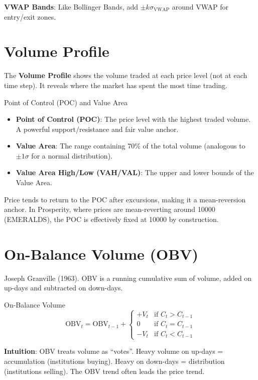 \documentclass[12pt,a4paper,openany]{report}
\theoremstyle{definition}
\begin{document}
\textbf{VWAP Bands}: Like Bollinger Bands, add $\pm k\sigma_{\text{VWAP}}$ around VWAP for entry/exit zones.

\section{Volume Profile}

The \textbf{Volume Profile} shows the volume traded at each price level (not at each time step). It reveals where the market has spent the most time trading.

\begin{definitionbox}{Point of Control (POC) and Value Area}
\begin{itemize}
  \item \textbf{Point of Control (POC)}: The price level with the highest traded volume. A powerful support/resistance and fair value anchor.
  \item \textbf{Value Area}: The range containing $70\%$ of the total volume (analogous to $\pm 1\sigma$ for a normal distribution).
  \item \textbf{Value Area High/Low (VAH/VAL)}: The upper and lower bounds of the Value Area.
\end{itemize}
\end{definitionbox}

Price tends to return to the POC after excursions, making it a mean-reversion anchor. In Prosperity, where prices are mean-reverting around 10000 (EMERALDS), the POC is effectively fixed at 10000 by construction.

\section{On-Balance Volume (OBV)}

Joseph Granville (1963). OBV is a running cumulative sum of volume, added on up-days and subtracted on down-days.

\begin{definitionbox}{On-Balance Volume}
\[
  \text{OBV}_t = \text{OBV}_{t-1} + \begin{cases} +V_t & \text{if } C_t > C_{t-1} \\ 0 & \text{if } C_t = C_{t-1} \\ -V_t & \text{if } C_t < C_{t-1} \end{cases}
\]
\end{definitionbox}

\textbf{Intuition}: OBV treats volume as ``votes''. Heavy volume on up-days = accumulation (institutions buying). Heavy on down-days = distribution (institutions selling). The OBV trend often leads the price trend.
\end{document}

